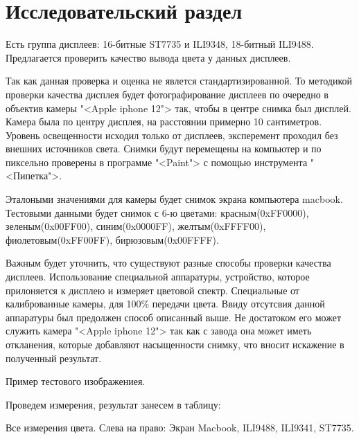 \chapter{Исследовательский раздел}

	Есть группа дисплеев: 16-битные ST7735 и ILI9348, 18-битный ILI9488. Предлагается проверить качество вывода цвета у данных дисплеев.%
	
	Так как данная проверка и оценка не явлется стандартизированной. То методикой проверки качества дисплея будет фотографирование дисплеев по очередно в объектив камеры "<Apple iphone 12"> так, чтобы в центре снимка был дисплей. Камера была по центру дисплея, на расстоянии примерно 10 сантиметров. Уровень освещенности исходил только от дисплеев, эксперемент проходил без внешних источников света. Снимки будут перемещены на компьютер и по пиксельно проверены в программе "<Paint"> с помощью инструмента "<Пипетка">.
	
	Эталоными значениями для камеры будет снимок экрана компьютера macbook. Тестовыми данными будет снимок с 6-ю цветами: красным(0xFF0000), зеленым(0x00FF00), синим(0x0000FF), желтым(0xFFFF00), фиолетовым(0xFF00FF), бирюзовым(0x00FFFF).
	
	Важным будет уточнить, что существуют разные способы проверки качества дисплеев. Использование специальной аппаратуры, устройство, которое прилоняется к дисплею и измеряет цветовой спектр. Специальные от калиброванные камеры, для 100\% передачи цвета. Ввиду отсутсвия данной аппаратуры был предолжен способ описанный выше. Не достатоком его может служить камера "<Apple iphone 12"> так как с завода она может иметь откланения, которые добавляют насыщенности снимку, что вносит искажение в полученный результат. 
	
	{Пример тестового изображениея.}
	
	Проведем измерения, результат занесем в таблицу:
	
	{Все измерения цвета. Слева на право: Экран Macbook, ILI9488, ILI9341, ST7735.}
	
